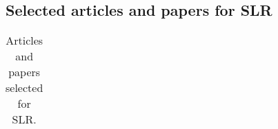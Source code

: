 
\begin{landscape}


  \section{Selected articles and papers for SLR}\label{App:A}

  \begin{center}

    \begin{longtable}{ | m{5em} | m{25em}| m{22em} | m{4em} | }
      \caption{Articles and papers selected for SLR.\label{articles}}                                                                                                                                                                                                                      \\


\end{longtable}
\end{center}
\end{landscape}
